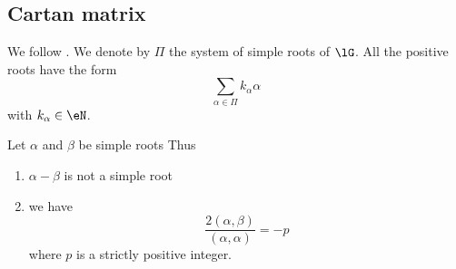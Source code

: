                     \subsection{Cartan matrix}

We follow \cite{Wybourne}. We denote by $\Pi$ the system of simple roots of $\lG$. All the positive roots have the form
\begin{equation}
    \sum_{\alpha\in\Pi}k_{\alpha}\alpha
\end{equation}
with $k_{\alpha}\in\eN$.

\begin{theorem}
    Let $\alpha$ and $\beta$ be simple roots Thus
    \begin{enumerate}
        \item
            $\alpha-\beta$ is not a simple root
        \item
            we have
            \begin{equation}        \label{EqabSuraaStrictNEf}
            \frac{ 2(\alpha,\beta) }{ (\alpha,\alpha) }=-p
        \end{equation}
        where $p$ is a strictly positive integer.
    \end{enumerate}
\end{theorem}

